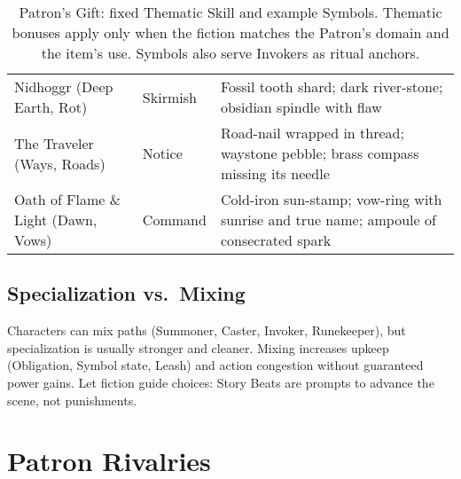 \begin{table}[H]
\begin{tabular}{@{}p{3.8cm}p{3.8cm}p{7.5cm}@{}}
Nidhoggr (Deep Earth, Rot) & Skirmish & Fossil tooth shard; dark river-stone; obsidian spindle with flaw \\
The Traveler (Ways, Roads) & Notice & Road-nail wrapped in thread; waystone pebble; brass compass missing its needle \\
Oath of Flame \& Light (Dawn, Vows) & Command & Cold-iron sun-stamp; vow-ring with sunrise and true name; ampoule of consecrated spark \\
\bottomrule
\end{tabular}
\caption{Patron's Gift: fixed Thematic Skill and example Symbols. Thematic bonuses apply only when the fiction matches the Patron’s domain and the item’s use. Symbols also serve Invokers as ritual anchors.}
\label{tab:gift-thematic-map}
\end{table}

\subsection{Specialization vs.\ Mixing}
\label{subsec:mixing}
Characters can mix paths (Summoner, Caster, Invoker, Runekeeper), but specialization is usually stronger and cleaner. Mixing increases upkeep (Obligation, Symbol state, Leash) and action congestion without guaranteed power gains. Let fiction guide choices: Story Beats are prompts to advance the scene, not punishments.






















\section{Patron Rivalries}
\label{sec:patron-rivalries}


